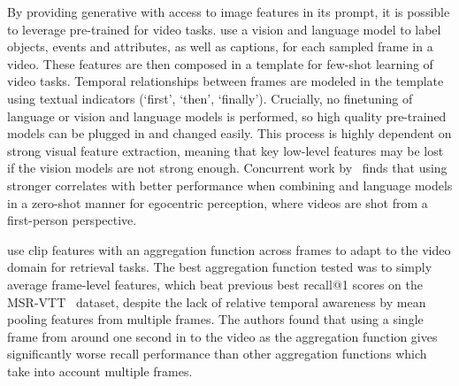 By providing generative  with access to image features in its
prompt, it is possible to leverage pre-trained  for video
tasks. \citet{wang2022vidil} use a vision and language model to label objects,
events and attributes, as well as captions, for each sampled frame in a video.
These features are then composed in a template for few-shot learning of video
tasks.  Temporal relationships between frames are modeled in the template using
textual indicators (`first', `then', `finally'). Crucially, no finetuning of
language or vision and language models is performed, so high quality
pre-trained models can be plugged in and changed easily. This process is highly
dependent on strong visual feature extraction, meaning that key low-level
features may be lost if the vision models are not strong enough. Concurrent
work by~\citet{zeng2023socratic} finds that using stronger 
correlates with better performance when combining  and language
models in a zero-shot manner for egocentric perception, where videos are shot from a first-person perspective.

\citet{portilloquintero2021clipvidret} use \acrshort{clip} features with an
aggregation function across frames to adapt to the video domain for retrieval
tasks. The best aggregation function tested was to simply average frame-level
features, which beat previous best recall@1 scores on the
MSR-VTT~\citep{xu2016msr-vtt} dataset, despite the lack of relative temporal
awareness by mean pooling features from multiple frames. The authors found that
using a single frame from around one second in to the video as the aggregation
function gives significantly worse recall performance than other aggregation
functions which take into account multiple frames.

